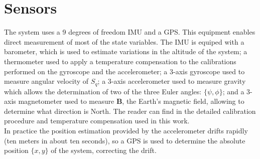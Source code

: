 \documentclass[conference]{IEEEtran}
\newcommand{\refp}[1]{(\ref{#1})}
\begin{document}
\section{Sensors}

The system uses a 9 degrees of freedom IMU and a GPS. This equipment enables direct measurement of most of the state variables. The IMU is equiped with a barometer, which is used to estimate variations in the altitude of the system; a thermometer used to apply a temperature compensation to the calibrations performed on the gyroscope and the accelerometer; a 3-axis gyroscope used to measure angular velocity of $S_q$; a 3-axis accelerometer used to measure gravity which allows the determination of two of the three Euler angles: $\{\psi, \phi\}$; and a 3-axis magnetometer used to measure $\mathbf{B}$, the Earth's magnetic field, allowing to determine what direction is North. The reader can find in \cite{bib:nosotros} the detailed calibration procedure and temperature compensation used in this work.\\
In practice the position estimation provided by the accelerometer drifts rapidly (ten meters in about ten seconds), so a GPS is used to determine the absolute position $\{x,y\}$ of the system, correcting the drift.

% 
\end{document}

